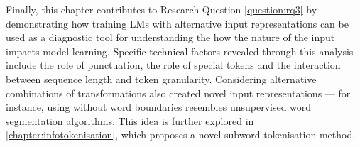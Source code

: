 Finally, this chapter contributes to Research Question \ref{question:rq3} by demonstrating how training LMs with alternative input representations can be used as a diagnostic tool for understanding the how the nature of the input impacts model learning. Specific technical factors revealed through this analysis include the role of punctuation, the role of special tokens and the interaction between sequence length and token granularity. Considering alternative combinations of transformations also created novel input representations --- for instance, using \bpe without word boundaries resembles unsupervised word segmentation algorithms. This idea is further explored in \cref{chapter:infotokenisation}, which proposes a novel subword tokenisation method.
